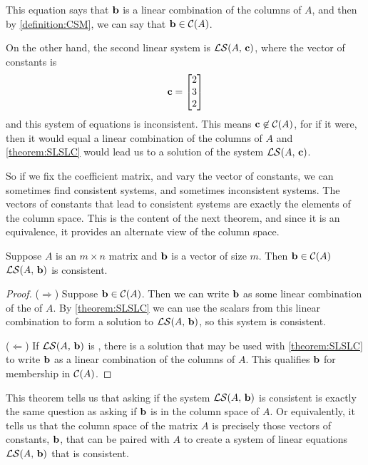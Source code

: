 \documentclass{ximera}
\begin{document}
\begin{example}
  This equation says that $\mathbf{b}$ is a linear combination of the
  columns of $A$, and then by \ref{definition:CSM}, we can say that
  $\mathbf{b}\in\mathcal{C}\!\left(A\right)$.

  On the other hand, the second linear system is
  $\mathcal{LS}\!\left(A,\,\mathbf{c}\right)$, where the vector of constants is
  \[
    \mathbf{c}=\begin{bmatrix}2\\3\\2\end{bmatrix}
  \]
  and this system of equations is inconsistent.  This means
  $\mathbf{c}\not\in\mathcal{C}\!\left(A\right)$, for if it were, then it would equal a
  linear combination of the columns of $A$ and \ref{theorem:SLSLC}
  would lead us to a solution of the system
  $\mathcal{LS}\!\left(A,\,\mathbf{c}\right)$.
\end{example}

So if we fix the coefficient matrix, and vary the vector of constants,
we can sometimes find consistent systems, and sometimes inconsistent
systems.  The vectors of constants that lead to consistent systems are
exactly the elements of the column space.  This is the content of the
next theorem, and since it is an equivalence, it provides an alternate
view of the column space.

\begin{theorem}
  \label{theorem:CSCS}
  Suppose $A$ is an $m\times n$ matrix and $\mathbf{b}$ is a vector of
  size $m$.  Then $\mathbf{b}\in\mathcal{C}\!\left(A\right)$ 
  $\mathcal{LS}\!\left(A,\,\mathbf{b}\right)$ is consistent.

\begin{proof}
  ($\Rightarrow$) Suppose $\mathbf{b}\in\mathcal{C}\!\left(A\right)$.  Then we can write
  $\mathbf{b}$ as some linear combination of the
   of $A$.  By
  \ref{theorem:SLSLC} we can use the scalars from this linear
  combination to form a solution to $\mathcal{LS}\!\left(A,\,\mathbf{b}\right)$, so
  this system is consistent.

  ($\Leftarrow$) If $\mathcal{LS}\!\left(A,\,\mathbf{b}\right)$ is
  , there
  is a solution that may be used with \ref{theorem:SLSLC} to write
  $\mathbf{b}$ as a linear combination of the columns of $A$.  This
  qualifies $\mathbf{b}$ for membership in $\mathcal{C}\!\left(A\right)$.
\end{proof}
\end{theorem}

This theorem tells us that asking if the system
$\mathcal{LS}\!\left(A,\,\mathbf{b}\right)$ is consistent is exactly the same
question as asking if $\mathbf{b}$ is in the column space of $A$.  Or
equivalently, it tells us that the column space of the matrix $A$ is
precisely those vectors of constants, $\mathbf{b}$, that can be paired
with $A$ to create a system of linear equations
$\mathcal{LS}\!\left(A,\,\mathbf{b}\right)$ that is consistent.
\end{document}
